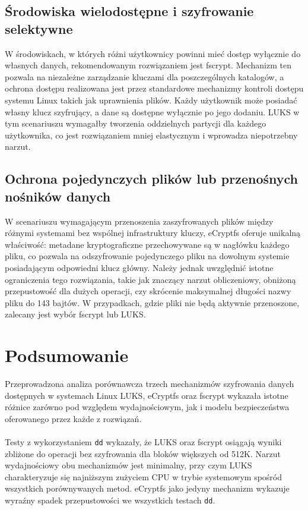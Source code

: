 \documentclass[a4paper]{article}
\begin{document}
\subsection{Środowiska wielodostępne i szyfrowanie selektywne}

W środowiskach, w których różni użytkownicy powinni mieć dostęp wyłącznie do własnych
danych, rekomendowanym rozwiązaniem jest fscrypt. Mechanizm ten pozwala na niezależne
zarządzanie kluczami dla poszczególnych katalogów, a ochrona dostępu realizowana jest przez
standardowe mechanizmy kontroli dostępu systemu Linux takich jak uprawnienia plików. Każdy
użytkownik może posiadać własny klucz szyfrujący, a dane są dostępne wyłącznie po jego dodaniu.
LUKS w tym scenariuszu wymagałby tworzenia oddzielnych partycji dla każdego użytkownika,
co jest rozwiązaniem mniej elastycznym i wprowadza niepotrzebny narzut.

\subsection{Ochrona pojedynczych plików lub przenośnych nośników danych}

W scenariuszu wymagającym przenoszenia zaszyfrowanych plików między różnymi systemami
bez wspólnej infrastruktury kluczy, eCryptfs oferuje unikalną właściwość: metadane
kryptograficzne przechowywane są w nagłówku każdego pliku, co pozwala na odszyfrowanie
pojedynczego pliku na dowolnym systemie posiadającym odpowiedni klucz główny. Należy jednak
uwzględnić istotne ograniczenia tego rozwiązania, takie jak znaczący narzut obliczeniowy,
obniżoną przepustowość dla dużych operacji, czy skrócenie maksymalnej długości nazwy pliku do
143 bajtów. W przypadkach, gdzie pliki nie będą aktywnie przenoszone, zalecany jest wybór fscrypt
lub LUKS.


\section{Podsumowanie}

Przeprowadzona analiza porównawcza trzech mechanizmów szyfrowania danych dostępnych
w systemach Linux LUKS, eCryptfs oraz fscrypt wykazała istotne różnice zarówno pod względem
wydajnościowym, jak i modelu bezpieczeństwa oferowanego przez każde z rozwiązań.
\\\\
Testy z wykorzystaniem \texttt{dd} wykazały, że LUKS oraz fscrypt osiągają wyniki zbliżone
do operacji bez szyfrowania dla bloków większych od 512K. Narzut wydajnościowy
obu mechanizmów jest minimalny, przy czym LUKS charakteryzuje się najniższym zużyciem CPU
w trybie systemowym spośród wszystkich porównywanych metod. eCryptfs jako jedyny mechanizm
wykazuje wyraźny spadek przepustowości we wszystkich testach \texttt{dd}.
\end{document}

